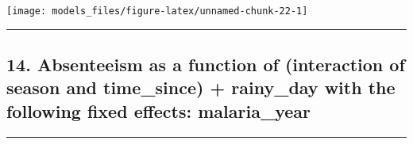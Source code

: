 \documentclass[]{article}
\begin{document}
\begin{center}\texttt{[image: models\_files/figure-latex/unnamed-chunk-22-1]} \end{center}

\newpage

\begin{center}\rule{0.5\linewidth}{\linethickness}\end{center}

\subsection{14. Absenteeism as a function of (interaction of season and
time\_since) + rainy\_day with the following fixed effects:
malaria\_year}\label{absenteeism-as-a-function-of-interaction-of-season-and-time_since-rainy_day-with-the-following-fixed-effects-malaria_year}

\begin{center}\rule{0.5\linewidth}{\linethickness}\end{center}
\end{document}
